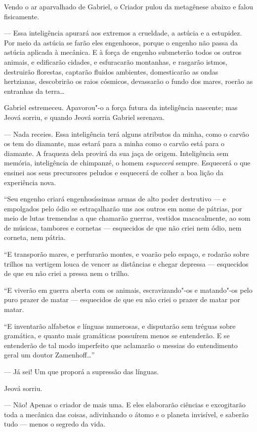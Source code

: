 Vendo o ar aparvalhado de Gabriel, o Criador pulou da metagênese abaixo
e falou fisicamente.

--- Essa inteligência apurará aos extremos a crueldade, a astúcia e a
estupidez. Por meio da astúcia se farão eles engenhosos, porque o
engenho não passa da astúcia aplicada à mecânica. E à força de engenho
submeterão todos os outros animais, e edificarão cidades, e esfuracarão
montanhas, e rasgarão istmos, destruirão florestas, captarão fluidos
ambientes, domesticarão as ondas hertzianas, descobrirão os raios
cósmicos, devassarão o fundo dos mares, roerão as entranhas da terra\ldots{}

Gabriel estremeceu. Apavorou"-o a força futura da inteligência nascente;
mas Jeová sorriu, e quando Jeová sorria Gabriel serenava.

--- Nada receies. Essa inteligência terá alguns atributos da minha, como
o carvão os tem do diamante, mas estará para a minha como o carvão está
para o diamante. A fraqueza dela provirá da sua jaça de origem.
Inteligência sem memória, inteligência de chimpanzé, o homem
\emph{esquecerá} sempre. Esquecerá o que ensinei aos seus precursores
peludos e esquecerá de colher a boa lição da experiência nova.

``Seu engenho criará engenhosíssimas armas de alto poder destrutivo ---
e empolgados pelo ódio se estraçalharão uns aos outros em nome de
pátrias, por meio de lutas tremendas a que chamarão guerras, vestidos
macacalmente, ao som de músicas, tambores e cornetas --- esquecidos de
que não criei nem ódio, nem corneta, nem pátria.

``E transporão mares, e perfurarão montes, e voarão pelo espaço, e
rodarão sobre trilhos na vertigem louca de vencer as distâncias e chegar
depressa --- esquecidos de que eu não criei a pressa nem o trilho.

``E viverão em guerra aberta com os animais, escravizando"-os e
matando"-os pelo puro prazer de matar --- esquecidos de que eu não criei
o prazer de matar por matar.

``E inventarão alfabetos e línguas numerosas, e disputarão sem tréguas
sobre gramática, e quanto mais gramáticas possuírem menos se entenderão.
E se entenderão de tal modo imperfeito que aclamarão o messias do
entendimento geral um doutor Zamenhoff\ldots{}''

--- Já sei! Um que proporá a supressão das línguas.

Jeová sorriu.

--- Não! Apenas o criador de mais uma. E eles elaborarão ciências e
excogitarão toda a mecânica das coisas, adivinhando o átomo e o planeta
invisível, e saberão tudo --- menos o segredo da vida.

